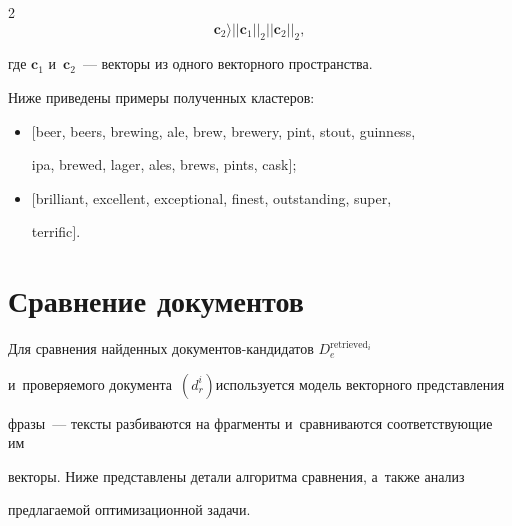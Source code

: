 \begin{multicols}{2}
\begin{equation}
{\mathbf{c}_2\rangle}{{||\mathbf{c}_1||_2||\mathbf{c}_2||_2}},


\end{equation}


где $\mathbf{c}_1$ и~$\mathbf{c}_2$~--- векторы из одного векторного пространства.








Ниже приведены примеры полученных кластеров:


\begin{itemize}


\item $[$beer, beers, brewing, ale, brew, brewery, pint, stout, guinness, 


ipa, brewed, lager, ales, brews, pints, cask$]$;


\item $[$brilliant, excellent, exceptional, finest, outstanding, super, 


terrific$]$.


\end{itemize}








\vspace*{-6pt}





\section{Сравнение документов}





Для сравнения найденных документов-кан\-ди\-да\-тов $D_e^{\mathrm{retrieved}_i}$ 


и~проверяемого документа~$(d_r^i)$\linebreak используется модель векторного пред\-став\-ле\-ния 


фразы~--- текс\-ты разбиваются на фрагменты и~сравниваются соответствующие им 


векторы. Ниже пред\-став\-ле\-ны детали алгоритма сравнения, а~также анализ 


пред\-ла\-га\-емой оптимизационной задачи.





\vspace*{-6pt}






\end{multicols}
